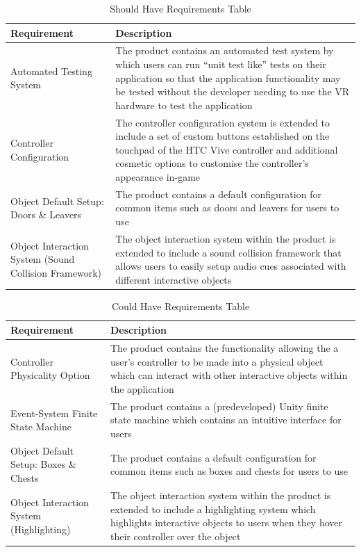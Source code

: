 \documentclass{l4proj}
\begin{document}
\begin{table}[]
    \centering
    \begin{tabular}{| p{5.5cm} | p{10.5cm} |}
        \hline
            Requirement & Description \\ \hline
            Automated Testing System & The product contains an automated test system by which users can run “unit test like” tests on their application so that the application functionality may be tested without the developer needing to use the VR hardware to test the application \\ \hline
            Controller Configuration & The controller configuration system is extended to include a set of custom buttons established on the touchpad of the HTC Vive controller and additional cosmetic options to customise the controller’s appearance in-game \\ \hline
            Object Default Setup: Doors \& Leavers & The product contains a default configuration for common items such as doors and leavers for users to use \\ \hline
            Object Interaction System (Sound Collision Framework) & The object interaction system within the product is extended to include a sound collision framework that allows users to easily setup audio cues associated with different interactive objects \\ \hline
    \end{tabular}
    \caption{Should Have Requirements Table}
    \label{tab:shouldhave}
\end{table}

\begin{table}[]
    \centering
    \begin{tabular}{ | p{5.5cm} | p{10.5cm} |}
        \hline
        Requirement & Description \\ \hline
        Controller Physicality Option & The product contains the functionality allowing the a user’s controller to be made into a physical object which can interact with other interactive objects within the application \\ \hline
        Event-System Finite State Machine & The product contains a (predeveloped) Unity finite state machine which contains an intuitive interface for users \\ \hline
        Object Default Setup: Boxes \& Chests & The product contains a default configuration for common items such as boxes and chests for users to use \\ \hline
        Object Interaction System (Highlighting) & The object interaction system within the product is extended to include a highlighting system which highlights interactive objects to users when they hover their controller over the object \\ \hline
    \end{tabular}
    \caption{Could Have Requirements Table}
    \label{tab:couldhave}
\end{table}
\end{document}
